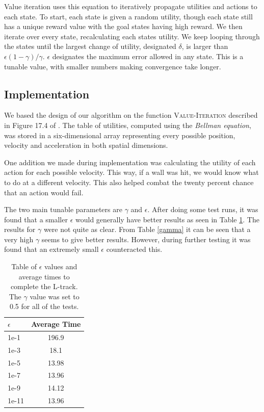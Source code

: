 \documentclass{article}
\begin{document}
	Value iteration uses this equation to iteratively propagate utilities and actions to each state. To start, each state is given a random utility, though each state still has a unique reward value with the goal states having high reward. We then iterate over every state, recalculating each states utility. We keep looping through the states until the largest change of utility, designated $\delta$, is larger than $\epsilon(1-\gamma)/\gamma$. $\epsilon$ designates the maximum error allowed in any state. This is a tunable value, with smaller numbers making convergence take longer.
	\subsection{Implementation}
	
	We based the design of our algorithm on the function \textsc{Value-Iteration} described in Figure 17.4 of \cite{ai}. 
	The table of utilities, computed using the \textit{Bellman equation}, was stored in a six-dimensional array representing every possible position, velocity and acceleration in both spatial dimensions.
	
	One addition we made during implementation was calculating the utility of each action for each possible velocity. This way, if a wall was hit, we would know what to do at a different velocity. This also helped combat the twenty percent chance that an action would fail.
	
	The two main tunable parameters are $\gamma$ and $\epsilon$. After doing some test runs, it was found that a smaller $\epsilon$ would generally have better results as seen in Table \ref{epsilon}. The results for $\gamma$ were not quite as clear. From Table \ref{gamma} it can be seen that a very high $\gamma$ seems to give better results. However, during further testing it was found that an extremely small $\epsilon$ counteracted this.
	\begin{table}
		\centering
		\begin{tabular}{|l|c|}
			\hline
			$\epsilon$ & Average Time \\ \hline
			1e-1 & 196.9 \\ 
			1e-3 & 18.1 \\
			1e-5 & 13.98\\
			1e-7 & 13.96 \\
			1e-9 & 14.12 \\ 
			1e-11 & 13.96 \\ \hline
		\end{tabular}
		\caption{Table of $\epsilon$ values and average times to complete the L-track. \\ The $\gamma$ value was set to 0.5 for all of the tests.}
		\label{epsilon}
	\end{table}
	
\end{document}
